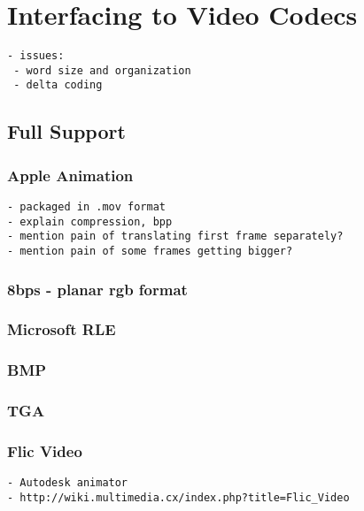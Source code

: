 \section{Interfacing to Video Codecs}
\label{sec:formats}

{\scriptsize
\begin{verbatim}
- issues:
 - word size and organization
 - delta coding
\end{verbatim}}

\subsection{Full Support}

\subsubsection{Apple Animation}

{\scriptsize
\begin{verbatim}
- packaged in .mov format
- explain compression, bpp
- mention pain of translating first frame separately?
- mention pain of some frames getting bigger?
\end{verbatim}}

\subsubsection{8bps - planar rgb format}

\subsubsection{Microsoft RLE}

\subsubsection{BMP}

\subsubsection{TGA}

\subsubsection{Flic Video}

{\scriptsize
\begin{verbatim}
- Autodesk animator
- http://wiki.multimedia.cx/index.php?title=Flic_Video
\end{verbatim}}

